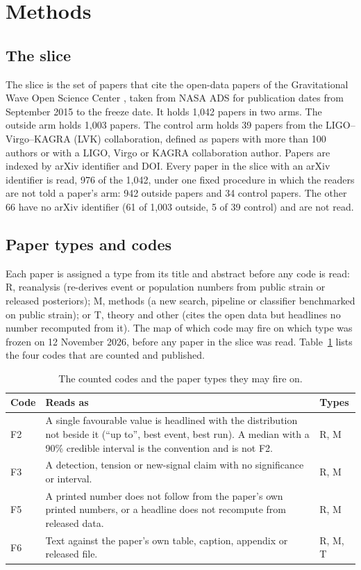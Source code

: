\documentclass[reprint,amsmath,amssymb,aps,superscriptaddress,nofootinbib]{revtex4-2}
\begin{document}
\section{Methods}

\subsection{The slice}

The slice is the set of papers that cite the open-data papers of the Gravitational Wave Open Science Center \cite{GWOSC2021,GWOSC2023,Vallisneri2015}, taken from NASA ADS for publication dates from September 2015 to the freeze date. It holds 1,042 papers in two arms. The outside arm holds 1,003 papers. The control arm holds 39 papers from the LIGO--Virgo--KAGRA (LVK) collaboration, defined as papers with more than 100 authors or with a LIGO, Virgo or KAGRA collaboration author. Papers are indexed by arXiv identifier and DOI. Every paper in the slice with an arXiv identifier is read, 976 of the 1,042, under one fixed procedure in which the readers are not told a paper's arm: 942 outside papers and 34 control papers. The other 66 have no arXiv identifier (61 of 1,003 outside, 5 of 39 control) and are not read.

\subsection{Paper types and codes}

Each paper is assigned a type from its title and abstract before any code is read: R, reanalysis (re-derives event or population numbers from public strain or released posteriors); M, methods (a new search, pipeline or classifier benchmarked on public strain); or T, theory and other (cites the open data but headlines no number recomputed from it). The map of which code may fire on which type was frozen on 12 November 2026, before any paper in the slice was read. Table~\ref{tab:codes} lists the four codes that are counted and published.

\begin{table}[t]
\caption{The counted codes and the paper types they may fire on.}
\label{tab:codes}
\centering\small
\begin{tabularx}{\linewidth}{l>{\raggedright\arraybackslash}X l}
\hline\hline
Code & Reads as & Types \\ \hline
F2 & A single favourable value is headlined with the distribution not beside it (``up to'', best event, best run). A median with a 90\% credible interval is the convention and is not F2. & R, M \\
F3 & A detection, tension or new-signal claim with no significance or interval. & R, M \\
F5 & A printed number does not follow from the paper's own printed numbers, or a headline does not recompute from released data. & R, M \\
F6 & Text against the paper's own table, caption, appendix or released file. & R, M, T \\
\hline\hline
\end{tabularx}
\end{table}
\end{document}
